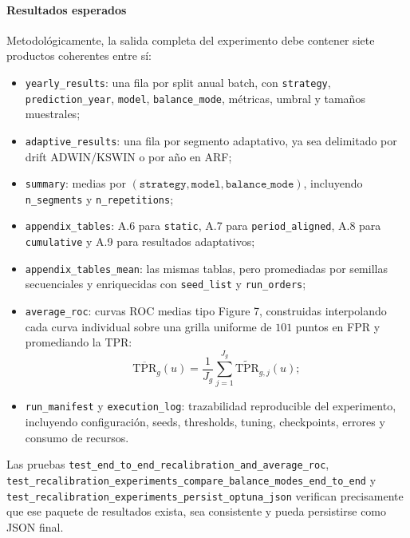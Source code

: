 \paragraph{Resultados esperados}
Metodol\'ogicamente, la salida completa del experimento debe contener siete productos coherentes entre s\'i:
\begin{itemize}[leftmargin=*]
  \item \texttt{yearly\_results}: una fila por split anual batch, con \texttt{strategy}, \texttt{prediction\_year}, \texttt{model}, \texttt{balance\_mode}, m\'etricas, umbral y tama\~nos muestrales;
  \item \texttt{adaptive\_results}: una fila por segmento adaptativo, ya sea delimitado por drift ADWIN/KSWIN o por a\~no en ARF;
  \item \texttt{summary}: medias por \((\texttt{strategy}, \texttt{model}, \texttt{balance\_mode})\), incluyendo \texttt{n\_segments} y \texttt{n\_repetitions};
  \item \texttt{appendix\_tables}: A.6 para \texttt{static}, A.7 para \texttt{period\_aligned}, A.8 para \texttt{cumulative} y A.9 para resultados adaptativos;
  \item \texttt{appendix\_tables\_mean}: las mismas tablas, pero promediadas por semillas secuenciales y enriquecidas con \texttt{seed\_list} y \texttt{run\_orders};
  \item \texttt{average\_roc}: curvas ROC medias tipo Figure 7, construidas interpolando cada curva individual sobre una grilla uniforme de \(101\) puntos en FPR y promediando la TPR:
  \[
  \overline{\mathrm{TPR}}_g(u) = \frac{1}{J_g}\sum_{j=1}^{J_g}\widetilde{\mathrm{TPR}}_{g,j}(u);
  \]
  \item \texttt{run\_manifest} y \texttt{execution\_log}: trazabilidad reproducible del experimento, incluyendo configuraci\'on, seeds, thresholds, tuning, checkpoints, errores y consumo de recursos.
\end{itemize}
Las pruebas \texttt{test\_end\_to\_end\_recalibration\_and\_average\_roc}, \texttt{test\_recalibration\_experiments\_compare\_balance\_modes\_end\_to\_end} y \texttt{test\_recalibration\_experiments\_persist\_optuna\_json} verifican precisamente que ese paquete de resultados exista, sea consistente y pueda persistirse como JSON final.

